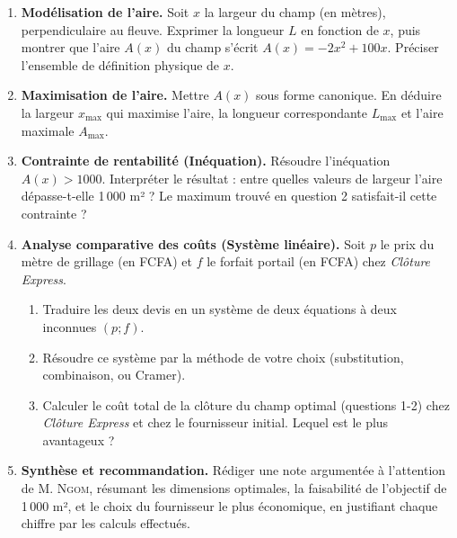 \documentclass[11pt]{article}
\newcounter{popsec}
\newcounter{popsub}
\newcommand{\courssub}[1]{%
  \stepcounter{popsub}%
  \par\vspace{9pt}\noindent{\popxbold\fontsize{11.5}{13}\selectfont\color{popink}{\color{poporange}\thepopsec.\thepopsub}\hspace{6pt}#1}\par\nopagebreak\vspace{4pt}
}
\begin{document}
\courssub{Consignes}
\begin{enumerate}
    \item \textbf{Modélisation de l'aire.} Soit $x$ la largeur du champ (en mètres), perpendiculaire au fleuve. Exprimer la longueur $L$ en fonction de $x$, puis montrer que l'aire $A(x)$ du champ s'écrit $A(x) = -2x^2 + 100x$. Préciser l'ensemble de définition physique de $x$.
    \item \textbf{Maximisation de l'aire.} Mettre $A(x)$ sous forme canonique. En déduire la largeur $x_{\text{max}}$ qui maximise l'aire, la longueur correspondante $L_{\text{max}}$ et l'aire maximale $A_{\text{max}}$.
    \item \textbf{Contrainte de rentabilité (Inéquation).} Résoudre l'inéquation $A(x) > 1000$. Interpréter le résultat : entre quelles valeurs de largeur l'aire dépasse-t-elle 1\,000 m² ? Le maximum trouvé en question 2 satisfait-il cette contrainte ?
    \item \textbf{Analyse comparative des coûts (Système linéaire).} Soit $p$ le prix du mètre de grillage (en FCFA) et $f$ le forfait portail (en FCFA) chez \textit{Clôture Express}. 
    \begin{enumerate}
        \item Traduire les deux devis en un système de deux équations à deux inconnues $(p; f)$.
        \item Résoudre ce système par la méthode de votre choix (substitution, combinaison, ou Cramer).
        \item Calculer le coût total de la clôture du champ optimal (questions 1-2) chez \textit{Clôture Express} et chez le fournisseur initial. Lequel est le plus avantageux ?
    \end{enumerate}
    \item \textbf{Synthèse et recommandation.} Rédiger une note argumentée à l'attention de M. \textsc{Ngom}, résumant les dimensions optimales, la faisabilité de l'objectif de 1\,000 m², et le choix du fournisseur le plus économique, en justifiant chaque chiffre par les calculs effectués.
\end{enumerate}
\end{document}
